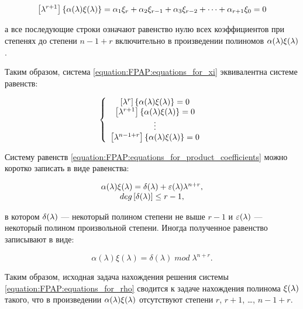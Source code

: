 	$$ \left [ \lambda^{r+1} \right ] \left \{ \alpha (\lambda) \xi (\lambda) \right \}
		= \alpha_1 \xi_r + \alpha_2 \xi_{r-1} + \alpha_3 \xi_{r-2} + \dots + \alpha_{r+1} \xi_0 = 0 $$

а все последующие строки означают равенство нулю всех коэффициентов при степенях до степени $n-1+r$ включительно в произведении полиномов
$\alpha (\lambda) \xi (\lambda)$.

Таким образом, система \eqref{equation:FPAP:equations_for_xi} эквивалентна системе равенств:

	\begin{equation} \label{equation:FPAP:equations_for_product_coefficients}
		\left \{
			\begin{array}{c}
				\left [ \lambda^{r} \right ] \left \{ \alpha (\lambda) \xi (\lambda) \right \} = 0 \\
				\left [ \lambda^{r+1} \right ] \left \{ \alpha (\lambda) \xi (\lambda) \right \} = 0 \\
				\vdots \\
				\left [ \lambda^{n-1+r} \right ] \left \{ \alpha (\lambda) \xi (\lambda) \right \} = 0 \\
			\end{array}
		\right .
	\end{equation}

Систему равенств \eqref{equation:FPAP:equations_for_product_coefficients} можно коротко записать в виде равенства:

	\begin{equation} \label{equation:FPAP:alpha_xi_product}
		\begin{array}{c}
			\alpha(\lambda) \xi(\lambda) = \delta(\lambda) + \varepsilon(\lambda) \lambda^{n+r}, \\
			deg \left [ \delta (\lambda) \right ] \le r-1, \\
		\end{array}
	\end{equation}

в котором $\delta (\lambda)$ --- некоторый полином степени не выше $r-1$ и $\varepsilon (\lambda)$ --- некоторый полином
произвольной степени. Иногда полученное равенство записывают в виде:

	$$ \alpha(\lambda) \xi(\lambda) = \delta(\lambda) \; mod \; \lambda^{n+r}. $$

Таким образом, исходная задача нахождения решения системы \eqref{equation:FPAP:equations_for_rho} сводится к задаче нахождения полинома
$\xi (\lambda)$ такого, что в произведении $\alpha (\lambda) \xi (\lambda)$ отсутствуют степени $r$, $r+1$, \dots, $n-1+r$.

